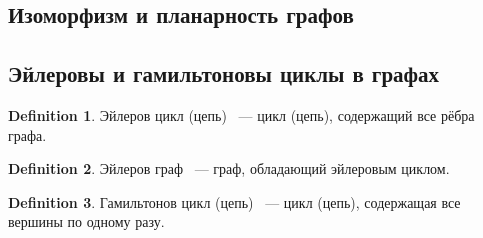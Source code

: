 \documentclass[a4paper]{article}
\theoremstyle{plain}
\theoremstyle{remark}
\theoremstyle{definition}
\newtheorem*{definition-star}{Definition}
\begin{document}
\subsection{Изоморфизм и планарность графов}
\subsection{Эйлеровы и гамильтоновы циклы в графах}
\begin{definition-star} Эйлеров цикл (цепь) ~--- цикл (цепь), содержащий все рёбра графа.
\end{definition-star}
\begin{definition-star} Эйлеров граф ~--- граф, обладающий эйлеровым циклом.
\end{definition-star}
\begin{definition-star} Гамильтонов цикл (цепь) ~--- цикл (цепь), содержащая все вершины по одному разу.
\end{definition-star}
\end{document}

